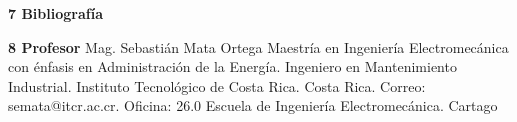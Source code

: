 \documentclass[letterpaper]{article}%
\begin{document}
\vspace*{5mm}%
\par\hspace*{0mm}\fontsize{12}{20}\selectfont \textbf{\textcolor{parte}{7 Bibliografía}}%
\newline%

\nocite{hernandez2013dibujo}
\nocite{lieu2011dibujo}
\nocite{bogoliubov1988dibujo}
\nocite{bogoliubov1989tareas}
\printbibliography[heading=none]%
\vspace*{10mm}%
\par\hspace*{0mm}\fontsize{12}{20}\selectfont \textbf{\textcolor{parte}{8 Profesor}}%
\newline%
Mag. Sebastián Mata Ortega\newline%
Maestría en Ingeniería Electromecánica con énfasis en Administración de la Energía.\newline%
Ingeniero en Mantenimiento Industrial.\newline%
Instituto Tecnológico de Costa Rica. Costa Rica.\newline%
Correo: semata@itcr.ac.cr. Oficina: 26.0\newline%
Escuela de Ingeniería Electromecánica. Cartago\newline%
%
\end{document}

